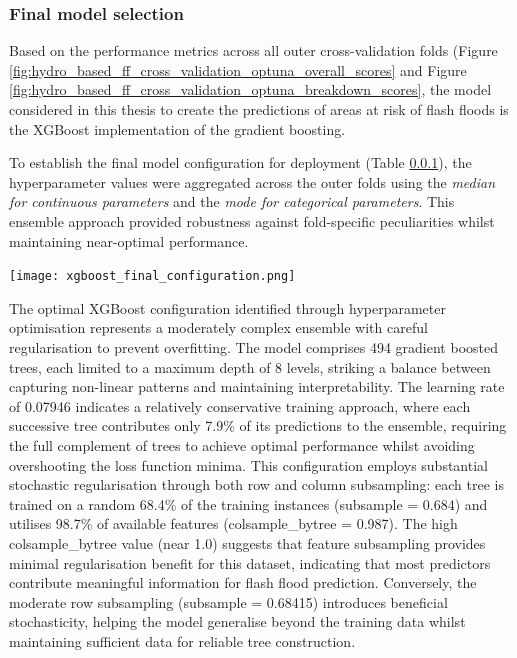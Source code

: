 \subsubsection{Final model selection}

Based on the performance metrics across all outer cross-validation folds (Figure \ref{fig:hydro_based_ff_cross_validation_optuna_overall_scores} and Figure \ref{fig:hydro_based_ff_cross_validation_optuna_breakdown_scores}, the model considered in this thesis to create the predictions of areas at risk of flash floods is the XGBoost implementation of the gradient boosting.

To establish the final model configuration for deployment (Table \ref{}), the hyperparameter values were aggregated across the outer folds using the \textit{median for continuous parameters} and the \textit{mode for categorical parameters}. This ensemble approach provided robustness against fold-specific peculiarities whilst maintaining near-optimal performance. 

\begin{table}[htbp]
\centering
{}
\texttt{[image: xgboost\_final\_configuration.png]}
\label{table:xgboost_final_configuration}
\end{table}

The optimal XGBoost configuration identified through hyperparameter optimisation represents a moderately complex ensemble with careful regularisation to prevent overfitting. The model comprises 494 gradient boosted trees, each limited to a maximum depth of 8 levels, striking a balance between capturing non-linear patterns and maintaining interpretability. The learning rate of 0.07946 indicates a relatively conservative training approach, where each successive tree contributes only 7.9\% of its predictions to the ensemble, requiring the full complement of trees to achieve optimal performance whilst avoiding overshooting the loss function minima. This configuration employs substantial stochastic regularisation through both row and column subsampling: each tree is trained on a random 68.4\% of the training instances (subsample = 0.684) and utilises 98.7\% of available features (colsample\_bytree = 0.987). The high colsample\_bytree value (near 1.0) suggests that feature subsampling provides minimal regularisation benefit for this dataset, indicating that most predictors contribute meaningful information for flash flood prediction. Conversely, the moderate row subsampling (subsample = 0.68415) introduces beneficial stochasticity, helping the model generalise beyond the training data whilst maintaining sufficient data for reliable tree construction.

